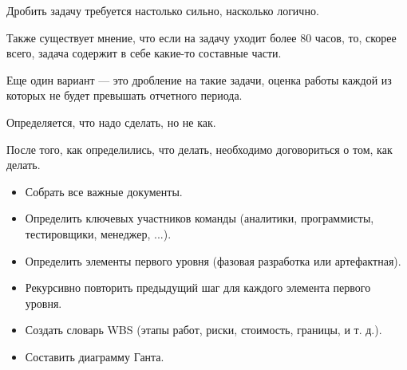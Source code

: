     \begin{Rem}
        Дробить задачу требуется настолько сильно, насколько логично.

        Также существует мнение, что если на задачу уходит более 80 часов, то, скорее всего, задача содержит в себе какие-то составные части.

        Еще один вариант --- это дробление на такие задачи, оценка работы каждой из которых не будет превышать отчетного периода.
    \end{Rem}

    \begin{Rem}
        Определяется, что надо сделать, но не как.
    \end{Rem}

    \begin{Rem}
        После того, как определились, что делать, необходимо договориться о том, как делать.
        \begin{itemize}
            \item Собрать все важные документы.
            \item Определить ключевых участников команды (аналитики, программисты, тестировщики, менеджер, ...).
            \item Определить элементы первого уровня (фазовая разработка или артефактная).
            \item Рекурсивно повторить предыдущий шаг для каждого элемента первого уровня.
            \item Создать словарь WBS (этапы работ, риски, стоимость, границы, и т. д.).
            \item Составить диаграмму Ганта.
        \end{itemize}
    \end{Rem}
    

